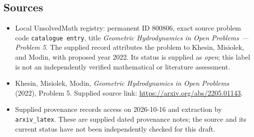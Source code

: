\documentclass[11pt]{article}
\begin{document}
\subsection{Sources}
\begin{itemize}
\item Local UnsolvedMath registry: permanent ID \(800806\), exact source problem code \texttt{catalogue entry}, title \emph{Geometric Hydrodynamics in Open Problems --- Problem 5}. The supplied record attributes the problem to Khesin, Misiolek, and Modin, with proposed year 2022. Its status is supplied as \emph{open}; this label is not an independently verified mathematical or literature assessment.
\item Khesin, Misiolek, Modin, \emph{Geometric Hydrodynamics in Open Problems} (2022), Problem 5. Supplied source link: \url{https://arxiv.org/abs/2205.01143}.
\item Supplied provenance records access on 2026-10-16 and extraction by \texttt{arxiv\_latex}. These are supplied dated provenance notes; the source and its current status have not been independently checked for this draft.
\end{itemize}
\end{document}
